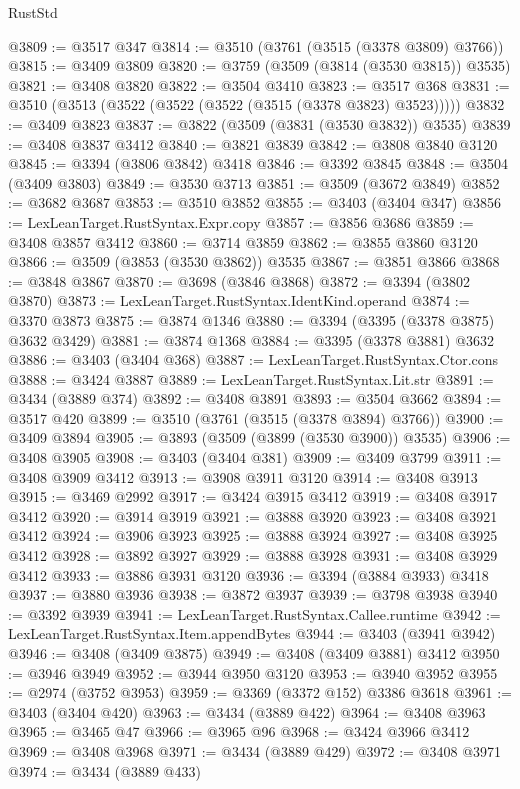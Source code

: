 \begin{lexlean}{RustStd}
\begin{coremodule}
@3809 := @3517 @347
@3814 := @3510 (@3761 (@3515 (@3378 @3809) @3766))
@3815 := @3409 @3809
@3820 := @3759 (@3509 (@3814 (@3530 @3815)) @3535)
@3821 := @3408 @3820
@3822 := @3504 @3410
@3823 := @3517 @368
@3831 := @3510 (@3513 (@3522 (@3522 (@3522 (@3515 (@3378 @3823) @3523)))))
@3832 := @3409 @3823
@3837 := @3822 (@3509 (@3831 (@3530 @3832)) @3535)
@3839 := @3408 @3837 @3412
@3840 := @3821 @3839
@3842 := @3808 @3840 @3120
@3845 := @3394 (@3806 @3842) @3418
@3846 := @3392 @3845
@3848 := @3504 (@3409 @3803)
@3849 := @3530 @3713
@3851 := @3509 (@3672 @3849)
@3852 := @3682 @3687
@3853 := @3510 @3852
@3855 := @3403 (@3404 @347)
@3856 := LexLeanTarget.RustSyntax.Expr.copy
@3857 := @3856 @3686
@3859 := @3408 @3857 @3412
@3860 := @3714 @3859
@3862 := @3855 @3860 @3120
@3866 := @3509 (@3853 (@3530 @3862)) @3535
@3867 := @3851 @3866
@3868 := @3848 @3867
@3870 := @3698 (@3846 @3868)
@3872 := @3394 (@3802 @3870)
@3873 := LexLeanTarget.RustSyntax.IdentKind.operand
@3874 := @3370 @3873
@3875 := @3874 @1346
@3880 := @3394 (@3395 (@3378 @3875) @3632 @3429)
@3881 := @3874 @1368
@3884 := @3395 (@3378 @3881) @3632
@3886 := @3403 (@3404 @368)
@3887 := LexLeanTarget.RustSyntax.Ctor.cons
@3888 := @3424 @3887
@3889 := LexLeanTarget.RustSyntax.Lit.str
@3891 := @3434 (@3889 @374)
@3892 := @3408 @3891
@3893 := @3504 @3662
@3894 := @3517 @420
@3899 := @3510 (@3761 (@3515 (@3378 @3894) @3766))
@3900 := @3409 @3894
@3905 := @3893 (@3509 (@3899 (@3530 @3900)) @3535)
@3906 := @3408 @3905
@3908 := @3403 (@3404 @381)
@3909 := @3409 @3799
@3911 := @3408 @3909 @3412
@3913 := @3908 @3911 @3120
@3914 := @3408 @3913
@3915 := @3469 @2992
@3917 := @3424 @3915 @3412
@3919 := @3408 @3917 @3412
@3920 := @3914 @3919
@3921 := @3888 @3920
@3923 := @3408 @3921 @3412
@3924 := @3906 @3923
@3925 := @3888 @3924
@3927 := @3408 @3925 @3412
@3928 := @3892 @3927
@3929 := @3888 @3928
@3931 := @3408 @3929 @3412
@3933 := @3886 @3931 @3120
@3936 := @3394 (@3884 @3933) @3418
@3937 := @3880 @3936
@3938 := @3872 @3937
@3939 := @3798 @3938
@3940 := @3392 @3939
@3941 := LexLeanTarget.RustSyntax.Callee.runtime
@3942 := LexLeanTarget.RustSyntax.Item.appendBytes
@3944 := @3403 (@3941 @3942)
@3946 := @3408 (@3409 @3875)
@3949 := @3408 (@3409 @3881) @3412
@3950 := @3946 @3949
@3952 := @3944 @3950 @3120
@3953 := @3940 @3952
@3955 := @2974 (@3752 @3953)
@3959 := @3369 (@3372 @152) @3386 @3618
@3961 := @3403 (@3404 @420)
@3963 := @3434 (@3889 @422)
@3964 := @3408 @3963
@3965 := @3465 @47
@3966 := @3965 @96
@3968 := @3424 @3966 @3412
@3969 := @3408 @3968
@3971 := @3434 (@3889 @429)
@3972 := @3408 @3971
@3974 := @3434 (@3889 @433)

\end{coremodule}
\end{lexlean}
